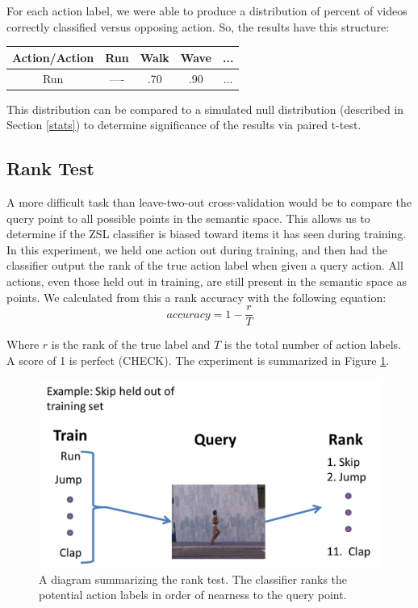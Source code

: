 \documentclass{article}
\begin{document}
For each action label, we were able to produce a distribution of percent of videos correctly classified versus opposing action. So, the results have this structure:

\begin{table}[h]
\centering
\begin{tabular}{c|c|c|c|c}
Action/Action & Run & Walk & Wave & ... \\ \hline
Run & ---- & .70 & .90 & ... \\
\end{tabular}
\end{table}

This distribution can be compared to a simulated null distribution (described in Section \ref{stats}) to determine significance of the results via paired t-test.

\subsection{Rank Test}
A more difficult task than leave-two-out cross-validation would be to compare the query point to all possible points in the semantic space. This allows us to determine if the ZSL classifier is biased toward items it has seen during training. In this experiment, we held one action out during training, and then had the classifier output the rank of the true action label when given a query action. All actions, even those held out in training, are still present in the semantic space as points. We calculated from this a rank accuracy with the following equation:
\begin{equation}
accuracy = 1 - \frac{r}{T}
\end{equation}

Where $r$ is the rank of the true label and $T$ is the total number of action labels.  A score of 1 is perfect (CHECK). The experiment is summarized in Figure \ref{ranking}.

\begin{figure}[h]
  \centering
  \includegraphics[width = .4\linewidth]{ranking}
  \caption{A diagram summarizing the rank test. The classifier ranks the potential action labels in order of nearness to the query point.}
  \label{ranking}
\end{figure}
\label{rank}
\end{document}
